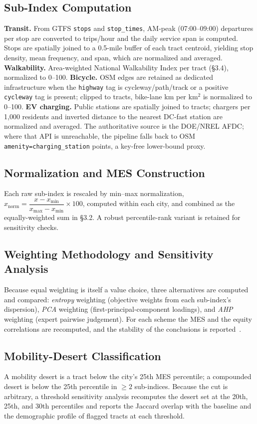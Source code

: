 \documentclass[11pt]{article}
\begin{document}
\subsection{Sub-Index Computation}
\textbf{Transit.} From GTFS \texttt{stops} and \texttt{stop\_times}, AM-peak
(07:00--09:00) departures per stop are converted to trips/hour and the daily
service span is computed. Stops are spatially joined to a 0.5-mile buffer of each
tract centroid, yielding stop density, mean frequency, and span, which are
normalized and averaged.
\textbf{Walkability.} Area-weighted National Walkability Index per tract (\S3.4),
normalized to 0--100.
\textbf{Bicycle.} OSM edges are retained as dedicated infrastructure when the
\texttt{highway} tag is cycleway/path/track or a positive \texttt{cycleway} tag
is present; clipped to tracts, bike-lane km per km$^2$ is normalized to 0--100.
\textbf{EV charging.} Public stations are spatially joined to tracts; chargers
per 1{,}000 residents and inverted distance to the nearest DC-fast station are
normalized and averaged. The authoritative source is the DOE/NREL AFDC; where
that API is unreachable, the pipeline falls back to OSM
\texttt{amenity=charging\_station} points, a key-free lower-bound proxy.

\subsection{Normalization and MES Construction}
Each raw sub-index is rescaled by min--max normalization,
$x_{\text{norm}} = \dfrac{x - x_{\min}}{x_{\max}-x_{\min}}\times 100$, computed
within each city, and combined as the equally-weighted sum in \S3.2. A robust
percentile-rank variant is retained for sensitivity checks.

\subsection{Weighting Methodology and Sensitivity Analysis}
Because equal weighting is itself a value choice, three alternatives are computed
and compared: \emph{entropy} weighting (objective weights from each sub-index's
dispersion), \emph{PCA} weighting (first-principal-component loadings), and
\emph{AHP} weighting (expert pairwise judgement). For each scheme the MES and the
equity correlations are recomputed, and the stability of the conclusions is
reported~\cite{nardo2008}.

\subsection{Mobility-Desert Classification}
A mobility desert is a tract below the city's 25th MES percentile; a compounded
desert is below the 25th percentile in $\geq 2$ sub-indices. Because the cut is
arbitrary, a threshold sensitivity analysis recomputes the desert set at the
20th, 25th, and 30th percentiles and reports the Jaccard overlap with the
baseline and the demographic profile of flagged tracts at each threshold.
\end{document}
